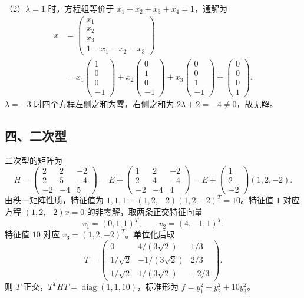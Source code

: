 \documentclass[11pt,fontset=fandol]{ctexart}
\begin{document}
（2）\(\lambda=1\) 时，方程组等价于 \(x_1+x_2+x_3+x_4=1\)，通解为 \[
\begin{aligned}
x&=\begin{pmatrix}x_1\\x_2\\x_3\\1-x_1-x_2-x_3\end{pmatrix}\\
&=x_1\begin{pmatrix}1\\0\\0\\-1\end{pmatrix}
+x_2\begin{pmatrix}0\\1\\0\\-1\end{pmatrix}
+x_3\begin{pmatrix}0\\0\\1\\-1\end{pmatrix}
+\begin{pmatrix}0\\0\\0\\1\end{pmatrix}.
\end{aligned}
\] \(\lambda=-3\) 时四个方程左侧之和为零，右侧之和为
\(2\lambda+2=-4\ne0\)，故无解。

\subsection{四、二次型}\label{ux56dbux4e8cux6b21ux578b}

二次型的矩阵为 \[
H=\begin{pmatrix}2&2&-2\\2&5&-4\\-2&-4&5\end{pmatrix}
=E+\begin{pmatrix}1&2&-2\\2&4&-4\\-2&-4&4\end{pmatrix}
=E+\begin{pmatrix}1\\2\\-2\end{pmatrix}(1,2,-2).
\] 由秩一矩阵性质，特征值为 \(1,1,1+(1,2,-2)(1,2,-2)^T=10\)。特征值
\(1\) 对应方程 \((1,2,-2)x=0\) 的非零解，取两条正交特征向量 \[
v_1=(0,1,1)^T,\qquad v_2=(4,-1,1)^T.
\] 特征值 \(10\) 对应 \(v_3=(1,2,-2)^T\)。单位化后取 \[
T=\begin{pmatrix}
0&4/(3\sqrt2)&1/3\\
1/\sqrt2&-1/(3\sqrt2)&2/3\\
1/\sqrt2&1/(3\sqrt2)&-2/3
\end{pmatrix}.
\] 则 \(T\) 正交，\(T^THT=\operatorname{diag}(1,1,10)\)，标准形为
\(f=y_1^2+y_2^2+10y_3^2\)。
\end{document}
